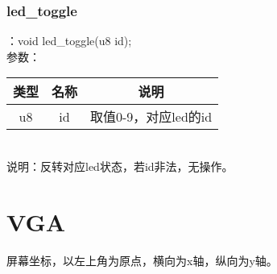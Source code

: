 \subsubsection{led\_toggle}
：void led\_toggle(u8 id);\\
参数：\\
\begin{tabular}{|c|c|c|}
    \hline
    类型 & 名称 & 说明\\\hline
    u8 & id & 取值0-9，对应led的id\\\hline
\end{tabular}\\
说明：反转对应led状态，若id非法，无操作。

\section{VGA}
屏幕坐标，以左上角为原点，横向为x轴，纵向为y轴。
